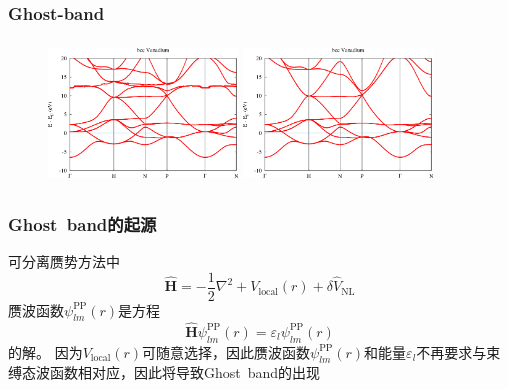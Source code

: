 \frame
{
	\frametitle{\textrm{Ghost-band}}
	\fontsize{9.2pt}{4.2pt}
\begin{figure}[h!]
\centering
\vspace*{-0.10in}
\includegraphics[height=1.50in,width=1.98in,viewport=0 0 450 320,clip]{Figures/Ghostband-Vanadium-1.png}
\includegraphics[height=1.50in,width=1.98in,viewport=0 0 450 320,clip]{Figures/Ghostband-Vanadium-4.png}
\caption{\fontsize{7.2pt}{4.2pt}}%
\label{Ghost-band}
\end{figure}
}

\frame
{
	\frametitle{\textrm{Ghost~band}的起源}
	可分离赝势方法中
	\begin{displaymath}
		\hat{\mathbf{H}}=-\dfrac12\nabla^2+V_{\mathrm{local}}(r)+\delta\hat{V}_{\mathrm{NL}}
	\end{displaymath}
	赝波函数$\psi_{lm}^{\mathrm{PP}}(r)$是方程
	\begin{displaymath}
		\hat{\mathbf{H}}\psi_{lm}^{\mathrm{PP}}(r)=\varepsilon_l\psi_{lm}^{\mathrm{PP}}(r)
	\end{displaymath}
	的解。
\vskip 15pt
	因为$V_{\mathrm{local}}(r)$可随意选择，因此赝波函数$\psi_{lm}^{\mathrm{PP}}(r)$和能量$\varepsilon_l$不再要求与束缚态波函数相对应，因此将导致\textrm{Ghost~band}的出现
}

